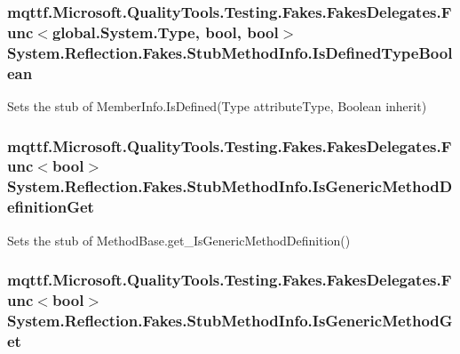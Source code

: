 \hypertarget{class_system_1_1_reflection_1_1_fakes_1_1_stub_method_info_a7b88fb15bf8bb104a26b7a41131b7030}{
\subsubsection[{Is\-Defined\-Type\-Boolean}]{\setlength{\rightskip}{0pt plus 5cm}mqttf.\-Microsoft.\-Quality\-Tools.\-Testing.\-Fakes.\-Fakes\-Delegates.\-Func$<$global.\-System.\-Type, bool, bool$>$ System.\-Reflection.\-Fakes.\-Stub\-Method\-Info.\-Is\-Defined\-Type\-Boolean}}\label{class_system_1_1_reflection_1_1_fakes_1_1_stub_method_info_a7b88fb15bf8bb104a26b7a41131b7030}


Sets the stub of Member\-Info.\-Is\-Defined(\-Type attribute\-Type, Boolean inherit)

\hypertarget{class_system_1_1_reflection_1_1_fakes_1_1_stub_method_info_a17ddec5cbcd2b72cba0d6f7f4278d4bf}{
\subsubsection[{Is\-Generic\-Method\-Definition\-Get}]{\setlength{\rightskip}{0pt plus 5cm}mqttf.\-Microsoft.\-Quality\-Tools.\-Testing.\-Fakes.\-Fakes\-Delegates.\-Func$<$bool$>$ System.\-Reflection.\-Fakes.\-Stub\-Method\-Info.\-Is\-Generic\-Method\-Definition\-Get}}\label{class_system_1_1_reflection_1_1_fakes_1_1_stub_method_info_a17ddec5cbcd2b72cba0d6f7f4278d4bf}


Sets the stub of Method\-Base.\-get\-\_\-\-Is\-Generic\-Method\-Definition()

\hypertarget{class_system_1_1_reflection_1_1_fakes_1_1_stub_method_info_abf9013e316d58601b37fff5277b9ff15}{
\subsubsection[{Is\-Generic\-Method\-Get}]{\setlength{\rightskip}{0pt plus 5cm}mqttf.\-Microsoft.\-Quality\-Tools.\-Testing.\-Fakes.\-Fakes\-Delegates.\-Func$<$bool$>$ System.\-Reflection.\-Fakes.\-Stub\-Method\-Info.\-Is\-Generic\-Method\-Get}}\label{class_system_1_1_reflection_1_1_fakes_1_1_stub_method_info_abf9013e316d58601b37fff5277b9ff15}


